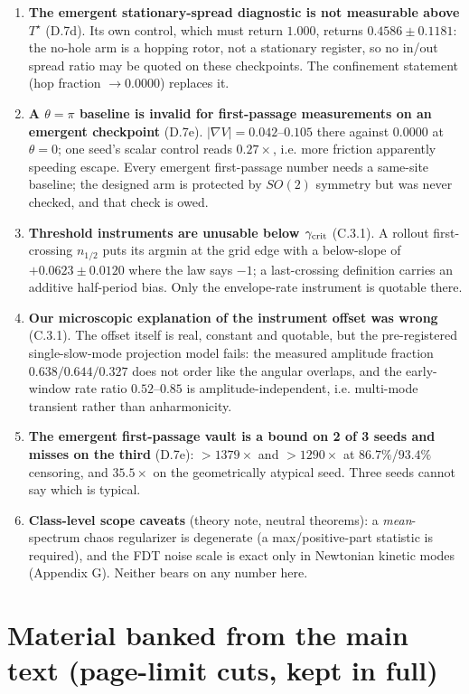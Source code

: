 \documentclass{article}
\begin{document}
\begin{enumerate}
\item \textbf{The emergent stationary-spread diagnostic is not measurable above $T^\star$} (D.7d). Its own control, which must return $1.000$, returns $0.4586\pm0.1181$: the no-hole arm is a hopping rotor, not a stationary register, so no in/out spread ratio may be quoted on these checkpoints. The confinement statement (hop fraction $\to0.0000$) replaces it.
\item \textbf{A $\theta=\pi$ baseline is invalid for first-passage measurements on an emergent checkpoint} (D.7e). $|\nabla V|=0.042$--$0.105$ there against $0.0000$ at $\theta=0$; one seed's scalar control reads $0.27\times$, i.e. more friction apparently speeding escape. Every emergent first-passage number needs a same-site baseline; the designed arm is protected by $SO(2)$ symmetry but was never checked, and that check is owed.
\item \textbf{Threshold instruments are unusable below $\gamma_{\rm crit}$} (C.3.1). A rollout first-crossing $n_{1/2}$ puts its argmin at the grid edge with a below-slope of $+0.0623\pm0.0120$ where the law says $-1$; a last-crossing definition carries an additive half-period bias. Only the envelope-rate instrument is quotable there.
\item \textbf{Our microscopic explanation of the instrument offset was wrong} (C.3.1). The offset itself is real, constant and quotable, but the pre-registered single-slow-mode projection model fails: the measured amplitude fraction $0.638/0.644/0.327$ does not order like the angular overlaps, and the early-window rate ratio $0.52$--$0.85$ is amplitude-independent, i.e. multi-mode transient rather than anharmonicity.
\item \textbf{The emergent first-passage vault is a bound on 2 of 3 seeds and misses on the third} (D.7e): $>1379\times$ and $>1290\times$ at $86.7\%$/$93.4\%$ censoring, and $35.5\times$ on the geometrically atypical seed. Three seeds cannot say which is typical.
\item \textbf{Class-level scope caveats} (theory note, neutral theorems): a \emph{mean}-spectrum chaos regularizer is degenerate (a max/positive-part statistic is required), and the FDT noise scale is exact only in Newtonian kinetic modes (Appendix G). Neither bears on any number here.
\end{enumerate}

\section{Material banked from the main text (page-limit cuts, kept in full)}
\end{document}
